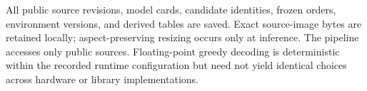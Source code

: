 \documentclass[letterpaper]{article}
\begin{document}
All public source revisions, model cards, candidate identities, frozen orders, environment versions, and derived tables are saved. Exact source-image bytes are retained locally; aspect-preserving resizing occurs only at inference. The pipeline accesses only public sources. Floating-point greedy decoding is deterministic within the recorded runtime configuration but need not yield identical choices across hardware or library implementations.
\end{document}
